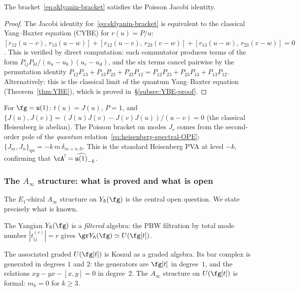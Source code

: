 \begin{proposition}
The bracket~\eqref{eq:sklyanin-bracket} satisfies the Poisson
Jacobi identity.
\end{proposition}

\begin{proof}
The Jacobi identity for~\eqref{eq:sklyanin-bracket} is
equivalent to the classical Yang--Baxter equation (CYBE) for
$r(u) = P/u$:
$[r_{12}(u{-}v),\, r_{13}(u{-}w)]
+ [r_{12}(u{-}v),\, r_{23}(v{-}w)]
+ [r_{13}(u{-}w),\, r_{23}(v{-}w)] = 0$.
This is verified by direct computation: each commutator
produces terms of the form $P_{ij}P_{kl}/(u_a - u_b)(u_c - u_d)$,
and the six terms cancel pairwise by the permutation identity
$P_{12}P_{13} + P_{13}P_{23} + P_{23}P_{12}
= P_{12}P_{23} + P_{23}P_{13} + P_{13}P_{12}$.
Alternatively: this is the classical limit of the quantum
Yang--Baxter equation (Theorem~\ref{thm:YBE}), which is
proved in~\S\ref{subsec:YBE-proof}.
\end{proof}

\begin{computation}
For $\fg = \mathfrak{u}(1)$: $t(u) = J(u)$,
$P = 1$, and
$\{J(u), J(v)\} = (J(u) J(v) - J(v) J(u))/(u-v) = 0$
(the classical Heisenberg is abelian). The Poisson bracket on
modes $J_r$ comes from the second-order pole of the
\emph{quantum} relation~\eqref{eq:heisenberg-spectral-OPE}:
$\{J_m, J_n\}_{\mathrm{qu}} = -k\,m\,\delta_{m+n,0}$.
This is the standard Heisenberg PVA at level $-k$, confirming
that $\cA^! = \widehat{\mathfrak{u}(1)}_{-k}$.
\end{computation}

\subsubsection*{The $A_\infty$ structure: what is proved and
what is open}

The $E_1$-chiral $A_\infty$ structure on $Y_\hbar(\fg)$ is
the central open question. We state precisely what is known.

The Yangian $Y_\hbar(\fg)$ is a \emph{filtered} algebra:
the PBW filtration by total mode number $|t_{ij}^{(r)}| = r$
gives $\gr Y_\hbar(\fg) \simeq U(\fg[t])$.

\begin{proposition}
The associated graded $U(\fg[t])$ is Koszul as a graded
algebra. Its bar complex is generated in degrees $1$ and $2$:
the generators are $\fg[t]$ in degree~$1$, and the relations
$xy - yx - [x,y] = 0$ in degree~$2$. The $A_\infty$ structure
on $U(\fg[t])$ is formal: $m_k = 0$ for $k \ge 3$.
\end{proposition}

